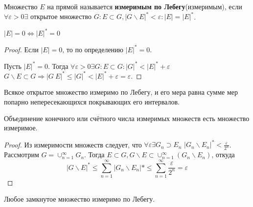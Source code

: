 \documentclass[11pt]{article}
\newcounter{th}\setcounter{th}{0}
\def\th{\par\smallskip\refstepcounter{th}\textbf{\arabic{th}}}
\newtheorem*{Theorem}{Теорема \th}
\begin{document}
Множество $E$ на прямой называется \textbf{измеримым по Лебегу}(измеримым), если
$\forall \varepsilon > 0 \exists \text{ открытое множество } G: E \subset G, |G \backslash E|^* < \varepsilon: |E| = |E|^*$.
\begin{Theorem}
$|E| = 0 \Leftrightarrow |E|^* = 0$
\end{Theorem}
\begin{proof}
Если $|E| = 0$, то по определению $|E|^* = 0$.

Пусть $|E|^* = 0$. Тогда $\forall \varepsilon > 0 \exists G: E \subset G: |G|^* < |E|^* + \varepsilon$
$G \backslash E \subset G \Rightarrow |G \ E|^* \leq |G|^* < |E|^* + \varepsilon = \varepsilon$.
\end{proof}
\begin{Theorem}
Всякое открытое множество измеримо по Лебегу, и его мера равна сумме мер попарно непересекающихся
покрывающих его интервалов.
\end{Theorem}
\begin{Theorem}
Объединение конечного или счётного числа измеримых множеств есть множество измеримое.
\end{Theorem}
\begin{proof}
Из измеримости множеств следует, что $\forall \varepsilon \exists G_n \supset E_n$
$|G_n \backslash E_n|^* < \frac{\varepsilon}{2^n}$. Рассмотрим $G = \cup_{n = 1}^{\infty}G_n$. Тогда
$E \subset G, G \backslash E \subset \cup_{n = 1}^{\infty}(G_n \backslash E_n)$, откуда
\begin{equation*}
|G \backslash E|^* \leq \sum_{n = 1}^{\infty}|G_n \backslash E_n|* \leq \sum_{n = 1}^{\infty}\frac{\varepsilon}{2^n} = \varepsilon
\end{equation*}
\end{proof}
\begin{Theorem}
Любое замкнутое множество измеримо по Лебегу.
\end{Theorem}
\end{document}
